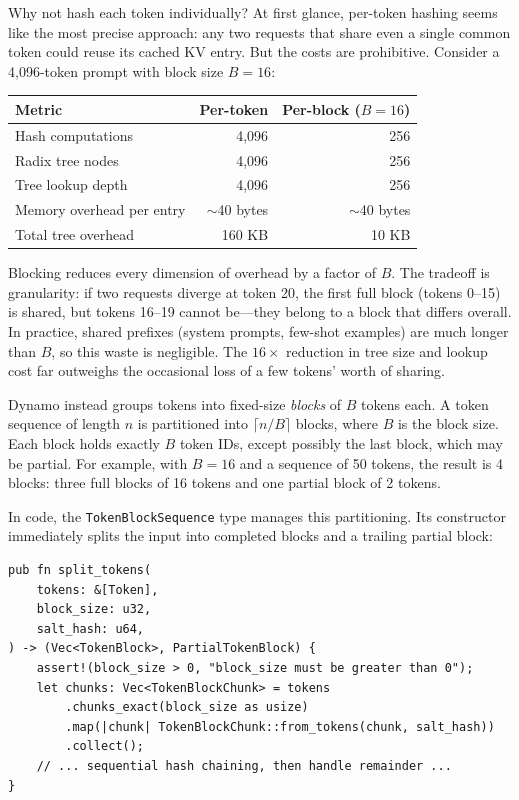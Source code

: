 \begin{whynotbox}{Why not hash each token individually?}
At first glance, per-token hashing seems like the most precise approach: any two requests that share even a single common token could reuse its cached KV entry. But the costs are prohibitive. Consider a 4,096-token prompt with block size $B = 16$:

\medskip
\begin{tabular}{lrr}
\textbf{Metric} & \textbf{Per-token} & \textbf{Per-block ($B{=}16$)} \\
\hline
Hash computations & 4,096 & 256 \\
Radix tree nodes & 4,096 & 256 \\
Tree lookup depth & 4,096 & 256 \\
Memory overhead per entry & $\sim$40 bytes & $\sim$40 bytes \\
Total tree overhead & 160 KB & 10 KB \\
\end{tabular}
\medskip

Blocking reduces every dimension of overhead by a factor of $B$. The tradeoff is granularity: if two requests diverge at token 20, the first full block (tokens 0--15) is shared, but tokens 16--19 cannot be---they belong to a block that differs overall. In practice, shared prefixes (system prompts, few-shot examples) are much longer than $B$, so this waste is negligible. The $16\times$ reduction in tree size and lookup cost far outweighs the occasional loss of a few tokens' worth of sharing.
\end{whynotbox}

%
Dynamo instead groups tokens into fixed-size \emph{blocks} of $B$ tokens each. A token sequence of length $n$ is partitioned into $\lceil n / B \rceil$ blocks, where $B$ is the block size. Each block holds exactly $B$ token IDs, except possibly the last block, which may be partial. For example, with $B = 16$ and a sequence of 50 tokens, the result is 4 blocks: three full blocks of 16 tokens and one partial block of 2 tokens.

In code, the \texttt{TokenBlockSequence} type manages this partitioning. Its constructor immediately splits the input into completed blocks and a trailing partial block:

\begin{verbatim}
pub fn split_tokens(
    tokens: &[Token],
    block_size: u32,
    salt_hash: u64,
) -> (Vec<TokenBlock>, PartialTokenBlock) {
    assert!(block_size > 0, "block_size must be greater than 0");
    let chunks: Vec<TokenBlockChunk> = tokens
        .chunks_exact(block_size as usize)
        .map(|chunk| TokenBlockChunk::from_tokens(chunk, salt_hash))
        .collect();
    // ... sequential hash chaining, then handle remainder ...
}
\end{verbatim}

